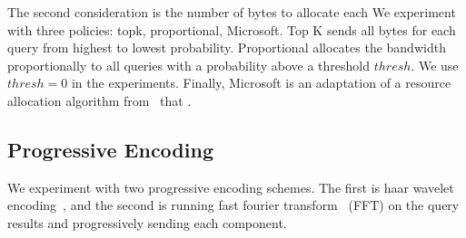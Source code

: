  The second consideration is the number of bytes to allocate each We experiment with three policies: topk, proportional, Microsoft.
Top K sends all bytes for each query from highest to lowest probability.
Proportional allocates the bandwidth proportionally to all queries with a probability above a threshold $thresh$.  We use $thresh=0$ in the experiments.
Finally, Microsoft is an adaptation of a resource allocation algorithm from~\cite{} that . 



\subsection{Progressive Encoding}

We experiment with two progressive encoding schemes.  The first is haar wavelet encoding~\cite{}, and the second is running fast fourier transform~\cite{nussbaumer2012fast} (FFT) on the query results and progressively sending each component.



